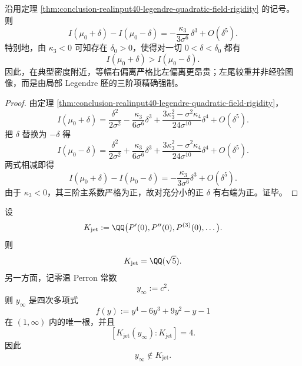 \begin{corollary}\label{cor:conclusion-realinput40-local-cramer-right-tail-more-costly}
沿用定理 \ref{thm:conclusion-realinput40-legendre-quadratic-field-rigidity} 的记号。则
\[
I(\mu_0+\delta)-I(\mu_0-\delta)
=
-\frac{\kappa_3}{3\sigma^6}\,\delta^3+O(\delta^5).
\]
特别地，由 \(\kappa_3<0\) 可知存在 \(\delta_0>0\)，使得对一切 \(0<\delta<\delta_0\) 都有
\[
I(\mu_0+\delta)>I(\mu_0-\delta).
\]
因此，在典型密度附近，等幅右偏离严格比左偏离更昂贵；左尾较重并非经验图像，而是由局部 Legendre 胚的三阶项精确强制。
\end{corollary}
\begin{proof}
由定理 \ref{thm:conclusion-realinput40-legendre-quadratic-field-rigidity}，
\[
I(\mu_0+\delta)
=
\frac{\delta^2}{2\sigma^2}
-\frac{\kappa_3}{6\sigma^6}\delta^3
+\frac{3\kappa_3^2-\sigma^2\kappa_4}{24\sigma^{10}}\delta^4
+O(\delta^5).
\]
把 \(\delta\) 替换为 \(-\delta\) 得
\[
I(\mu_0-\delta)
=
\frac{\delta^2}{2\sigma^2}
+\frac{\kappa_3}{6\sigma^6}\delta^3
+\frac{3\kappa_3^2-\sigma^2\kappa_4}{24\sigma^{10}}\delta^4
+O(\delta^5).
\]
两式相减即得
\[
I(\mu_0+\delta)-I(\mu_0-\delta)
=
-\frac{\kappa_3}{3\sigma^6}\delta^3+O(\delta^5).
\]
由于 \(\kappa_3<0\)，其三阶主系数严格为正，故对充分小的正 \(\delta\) 有右端为正。证毕。
\end{proof}

\begin{theorem}\label{thm:conclusion-realinput40-euler-jet-zero-temp-perron-field-splitting}
设
\[
K_{\mathrm{jet}}:=\QQ\bigl(P'(0),P''(0),P^{(3)}(0),\dots\bigr).
\]
则
\[
K_{\mathrm{jet}}=\QQ(\sqrt5).
\]
另一方面，记零温 Perron 常数
\[
y_\infty:=c^2.
\]
则 \(y_\infty\) 是四次多项式
\[
f(y):=y^4-6y^3+9y^2-y-1
\]
在 \((1,\infty)\) 内的唯一根，并且
\[
[K_{\mathrm{jet}}(y_\infty):K_{\mathrm{jet}}]=4.
\]
因此
\[
y_\infty\notin K_{\mathrm{jet}}.
\]
\end{theorem}

